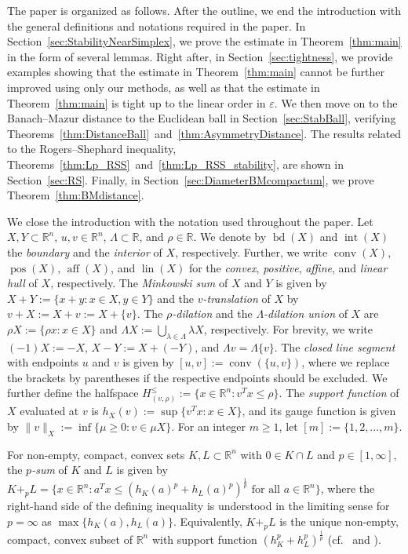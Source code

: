 \documentclass{amsart}
\newcommand{\cemph}[1]{\emph{\color{red}#1}}
\newcommand\R{\mathbb{R}}
\DeclareMathOperator{\conv}{conv}
\DeclareMathOperator{\pos}{pos}
\DeclareMathOperator{\aff}{aff}
\DeclareMathOperator{\lin}{lin}
\DeclareMathOperator{\inte}{int}
\DeclareMathOperator{\bd}{bd}
\begin{document}
The paper is organized as follows.
After the outline, we end the introduction with the general definitions and notations required in the paper.
In Section~\ref{sec:StabilityNearSimplex}, we prove the estimate in Theorem~\ref{thm:main} in the form of several lemmas.
Right after, in Section~\ref{sec:tightness}, we provide examples showing that the estimate in Theorem~\ref{thm:main} cannot be further improved using only our methods, as well as
that the estimate in Theorem~\ref{thm:main} is tight up to the linear order in $\varepsilon$.
We then move on to the Banach--Mazur distance to the Euclidean ball in Section~\ref{sec:StabBall}, verifying Theorems~\ref{thm:DistanceBall}~and~\ref{thm:AsymmetryDistance}.
The results related to the Rogers--Shephard inequality, Theorems~\ref{thm:Lp_RSS}~and~\ref{thm:Lp_RSS_stability}, are shown in Section~\ref{sec:RS}.
Finally, in Section~\ref{sec:DiameterBMcompactum}, we prove Theorem~\ref{thm:BMdistance}.

We close the introduction with the notation used throughout the paper.
Let $X, Y \subset \R^n$, $u,v \in \R^n$, $\Lambda \subset \R$, and $\rho \in \R$.
We denote by $\bd(X)$ and $\inte(X)$ the \cemph{boundary} and the \cemph{interior} of $X$, respectively.
Further, we write $\conv(X)$, $\pos(X)$, $\aff(X)$, and $\lin(X)$ for the \cemph{convex}, \cemph{positive}, \cemph{affine}, and \cemph{linear hull} of $X$, respectively.
The \cemph{Minkowski sum} of $X$ and $Y$ is given by $X + Y := \{ x + y : x \in X, y \in Y \}$ and the \cemph{$v$-translation} of $X$ by $v + X := X + v := X + \{v\}$.
The \cemph{$\rho$-dilation} and the \cemph{$\Lambda$-dilation union} of $X$ are $\rho X := \{ \rho x : x \in X \}$ and $\Lambda X := \bigcup_{\lambda \in \Lambda} \lambda X$, respectively.
For brevity, we write $(-1) X := -X$, $X-Y := X + (-Y)$, and $\Lambda v = \Lambda \{v\}$.
The \cemph{closed line segment} with endpoints $u$ and $v$ is given by $[u,v] := \conv(\{u,v\})$,
where we replace the brackets by parentheses if the respective endpoints should be excluded.
We further define the halfspace $H_{(v,\rho)}^\leq := \{ x \in \R^n : v^T x \leq \rho \}$.
The \cemph{support function} of $X$ evaluated at $v$ is $h_X(v) := \sup \{ v^T x : x \in X \}$,
and its gauge function is given by $\|v\|_X := \inf \{ \mu \geq 0 : v \in \mu X \}$.
For an integer $m \geq 1$, let $[m]:=\{1,2,\dots,m\}$.

For non-empty, compact, convex sets $K,L \subset \R^n$ with $0 \in K \cap L$ and $p \in [1,\infty]$, the \cemph{$p$-sum} of $K$ and $L$ is given by $K +_p L = \{ x \in \R^n : a^T x \leq (h_K(a)^p + h_L(a)^p)^{\frac{1}{p}} \text{ for all } a \in \R^n \}$, where the right-hand side of the defining inequality is understood in the limiting sense for $p = \infty$ as $\max\{h_K(a),h_L(a)\}$.
Equivalently, $K +_p L$ is the unique non-empty, compact, convex subset of $\R^n$ with support function $(h_K^p + h_L^p)^{\frac{1}{p}}$ (cf.~\cite{1962:Firey} and \cite[Chapter~$9$]{2014:Schneider}).
\end{document}

